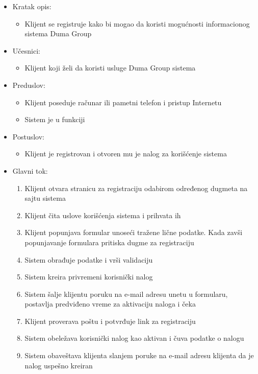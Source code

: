 \documentclass[a4paper]{article}
\begin{document}
\begin{itemize}
    \item Kratak opis:
        \begin{itemize}
            \item Klijent se registruje kako bi mogao da koristi mogućnosti informacionog sistema Duma Group
        \end{itemize}
    \item Učesnici:
        \begin{itemize}
            \item Klijent koji želi da koristi usluge Duma Group sistema
        \end{itemize}
    \item Preduslov:
        \begin{itemize}
            \item Klijent poseduje računar ili pametni telefon i pristup Internetu
            \item Sistem je u funkciji
        \end{itemize}
    \item Postuslov:
        \begin{itemize}
            \item Klijent je registrovan i otvoren mu je nalog za korišćenje sistema
        \end{itemize}
    \item Glavni tok:
        \begin{enumerate}
            \item  Klijent otvara stranicu za registraciju odabirom određenog dugmeta na sajtu sistema
            \item Klijent čita uslove korišćenja sistema i prihvata ih
            \item Klijent popunjava formular unoseći tražene lične podatke. Kada zavši popunjavanje formulara pritiska dugme za registraciju
            \item Sistem obrađuje podatke i vrši validaciju
            \item Sistem kreira privremeni korisnički nalog
            \item Sistem šalje klijentu poruku na e-mail adresu unetu u formularu, postavlja predviđeno vreme za aktivaciju naloga i čeka
            \item Klijent proverava poštu i potvrđuje link za registraciju
            \item Sistem obeležava korisnički nalog kao aktivan i čuva podatke o nalogu
            \item Sistem obaveštava klijenta slanjem poruke na e-mail adresu klijenta da je nalog uspešno kreiran 

\end{enumerate}
\end{itemize}
\end{document}
